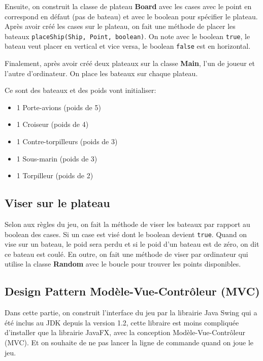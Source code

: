 \documentclass[12pt, pdflatex]{article}
\begin{document}
    Ensuite, on construit la classe de plateau \textbf{Board} avec les cases avec le point en correspond en défaut (pas de bateau) et avec le boolean pour spécifier le plateau. Après avoir créé les cases sur le plateau, on fait une méthode de placer les bateaux \texttt{placeShip(Ship, Point, boolean)}. On note avec le boolean \texttt{true}, le bateau veut placer en vertical et vice versa, le boolean \texttt{false} est en horizontal. 

    Finalement, après avoir créé deux plateaux sur la classe \textbf{Main}, l'un de joueur et l'autre d'ordinateur. On place les bateaux sur chaque plateau.

    Ce sont des bateaux et des poids vont initialiser:
    \begin{itemize}
        \item 1 Porte-avions (poids de 5)
        \item 1 Croiseur (poids de 4)
        \item 1 Contre-torpilleurs (poids de 3)
        \item 1 Sous-marin (poids de 3)
        \item 1 Torpilleur (poids de 2)
    \end{itemize}



    \subsection{Viser sur le plateau}
    Selon aux règles du jeu, on fait la méthode de viser les bateaux par rapport au boolean des cases. Si un case est visé dont le boolean devient \texttt{true}. Quand on vise sur un bateau, le poid sera perdu et si le poid d'un bateau est de zéro, on dit ce bateau est coulé. En outre, on fait une méthode de viser par ordinateur qui utilise la classe \textbf{Random} avec le boucle pour trouver les points disponibles.



    \subsection{Design Pattern Modèle-Vue-Contrôleur (MVC)}
    Dans cette partie, on construit l'interface du jeu par la librairie Java Swing qui a été inclus au JDK depuis la version 1.2, cette libraire est moins compliquée d'installer que la librairie JavaFX, avec la conception Modèle-Vue-Contrôleur (MVC). Et on souhaite de ne pas lancer la ligne de commande quand on joue le jeu. 
    
\end{document}
